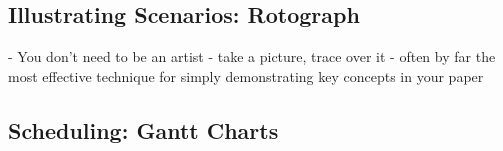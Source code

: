 







\newpage
\subsection{Illustrating Scenarios: Rotograph}

- You don't need to be an artist
- take a picture, trace over it
- often by far the most effective technique for simply demonstrating key concepts in your paper 



\newpage
\subsection{Scheduling: Gantt Charts}

